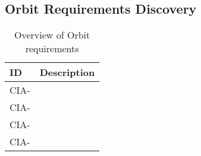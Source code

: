 \subsection{Orbit Requirements Discovery} \label{sec:req-orbit}

\begin{table}[H]
	\caption{Overview of Orbit requirements}
	\begin{tabular}{|p{}|p{}|}
		\hline
		ID         & Description                                                                                                      \\ \hline \hline
		CIA- &            						\\ \hline
		CIA- &          						\\ \hline
		CIA- &       							\\ \hline
		CIA- &     			     		 	 	\\ \hline		
	\end{tabular}
	\label{tab:orbitreq}
\end{table}